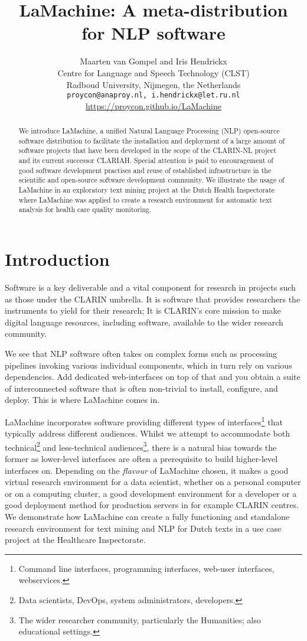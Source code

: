 \documentclass[a4paper,11pt]{article}
\title{LaMachine: A meta-distribution for NLP software}
\author{Maarten van Gompel  and Iris Hendrickx\\
  Centre for Language and Speech Technology (CLST) \\
  Radboud University, Nijmegen, the Netherlands \\
  {\tt proycon@anaproy.nl, i.hendrickx@let.ru.nl} \\ %
  \url{https://proycon.github.io/LaMachine}
}
\date{}
\begin{document}
\maketitle

\begin{abstract}
We introduce LaMachine, a unified Natural Language Processing (NLP) open-source software distribution to facilitate the
installation and deployment of a large amount of software projects that have been developed in the scope of the
CLARIN-NL project and its current successor CLARIAH. Special attention is paid to encouragement of good software
development practises and reuse of established infrastructure in the scientific and open-source software development
community. We illustrate the usage of LaMachine in an exploratory text mining project at the Dutch Health Inspectorate where LaMachine was applied to create a research environment for automatic text analysis for health care quality monitoring.
\end{abstract}

\section{Introduction} \label{intro}

Software is a key deliverable and a vital component for research in projects such as those under the CLARIN umbrella. It
is software that provides researchers the instruments to yield for their research;
It is CLARIN's core mission to make digital language resources,
including software, available to the wider research community.

We see that NLP software often takes on complex forms such as processing pipelines invoking various individual
components, which in turn rely on various dependencies. Add dedicated web-interfaces on top of that and you obtain a
suite of interconnected software that is often non-trivial to install, configure, and deploy. This is where LaMachine
comes in.

LaMachine incorporates software providing different types of interfaces\footnote{Command line interfaces, programming
interfaces, web-user interfaces, webservices.} that typically address different audiences. Whilst we attempt to
accommodate both technical\footnote{Data scientists, DevOps, system administrators, developers.} and less-technical
audiences\footnote{The wider researcher community, particularly the Humanities; also educational settings.}, there is a natural bias towards the former as
lower-level interfaces are often a prerequisite to build higher-level interfaces on. Depending on the \emph{flavour} of
LaMachine chosen, it makes a good virtual research environment for a data scientist, whether on a personal computer or on a computing
cluster, a good development environment for a developer or a good deployment method for production servers in for
example CLARIN centres.
We demonstrate how LaMachine can create a fully functioning and standalone research environment for text mining  and NLP for Dutch texts in a use case project at the Healthcare Inspectorate.
\end{document}
